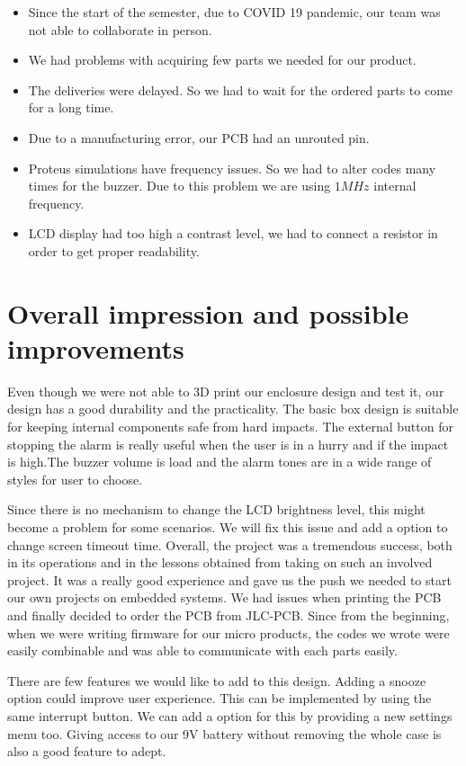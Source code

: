 \begin{itemize}
\item Since the start of the semester, due to COVID 19 pandemic, our team was not able to collaborate in person.
\item We had problems with acquiring few parts we needed for our product.
\item The deliveries were delayed. So we had to wait for the ordered parts to come for a long time.
\item Due to a manufacturing error, our PCB had an unrouted pin.
\item Proteus simulations have frequency issues. So we had to alter codes many times for the buzzer. Due to this problem we are using $1MHz$ internal frequency.
\item LCD display had too high a contrast level, we had to connect a resistor in order to get proper readability.
    
\end{itemize}

\section{Overall impression and possible improvements}
Even though we were not able to 3D print our enclosure design and test it, our design has a good durability and the practicality. The basic box design is suitable for keeping internal components safe from hard impacts. The external button for stopping the alarm is really useful when the user is in a hurry and if the impact is high.The buzzer volume is load and the alarm tones are in a wide range of styles for user to choose.

Since there is no mechanism to change the LCD brightness level, this might become a problem for some scenarios. We will fix this issue and add a option to change screen timeout time.
\newpage
Overall, the project was a tremendous success, both in its operations and in the lessons obtained from taking on such an involved project. It was a really good experience and gave us the push we needed to start our own projects on embedded systems.
We had issues when printing the PCB and finally decided to order the PCB from JLC-PCB. Since from the beginning, when we were writing firmware for our micro products, the codes we wrote were easily combinable and was able to communicate with each parts easily. 

There are few features we would like to add to this design. Adding a snooze option could improve user experience. This can be implemented by using the same interrupt button. We can add a option for this by providing a new settings menu too. Giving access to our 9V battery without removing the whole case is also a good feature to adept.


